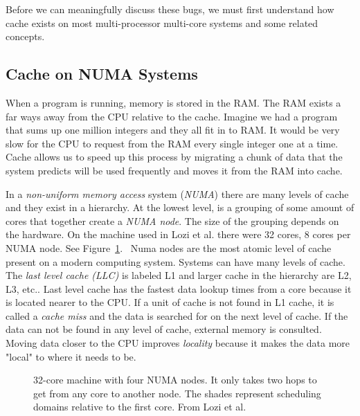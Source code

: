 \documentclass{sig-alternate}
\begin{document}
Before we can meaningfully discuss these bugs, we must first understand how cache exists on most multi-processor multi-core systems and some related concepts.

\subsection{Cache on NUMA Systems}
\label{sec:cache}

When a program is running, memory is stored in the RAM. The RAM exists a far ways away from the CPU relative to the cache. Imagine we had a program that sums up one million integers and they all fit in to RAM. It would be very slow for the CPU to request from the RAM every single integer one at a time. Cache allows us to speed up this process by migrating a chunk of data that the system predicts will be used frequently and moves it from the RAM into cache.

In a \emph{non-uniform memory access} system (\emph{NUMA}) there are many levels of cache and they exist in a hierarchy. At the lowest level, is a grouping of some amount of cores that together create a \emph{NUMA node}. The size of the grouping depends on the hardware. On the machine used in Lozi et al. there were 32 cores, 8 cores per NUMA node. See Figure~\ref{fig:NUMA}.~\cite{Lozi:2016} Numa nodes are the most atomic level of cache present on a modern computing system. Systems can have many levels of cache. The \emph{last level cache (LLC)} is labeled L1 and larger cache in the hierarchy are L2, L3, etc.. Last level cache has the fastest data lookup times from a core because it is located nearer to the CPU. If a unit of cache is not found in L1 cache, it is called a \emph{cache miss} and the data is searched for on the next level of cache. If the data can not be found in any level of cache, external memory is consulted. Moving data closer to the CPU improves \emph{locality} because it makes the data more "local" to where it needs to be.~\cite{WikiCache}


\begin{figure}
\centering
{}
\caption{32-core machine with four NUMA nodes. It only takes two hops to get from any core to another node. The shades represent scheduling domains relative to the first core.  From Lozi et al.~\cite{Lozi:2016}}
\label{fig:NUMA}
\end{figure}
\end{document}
